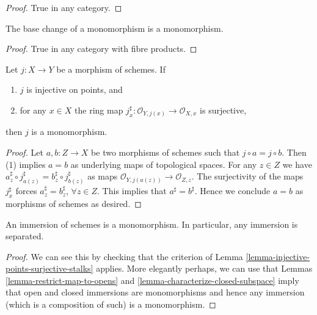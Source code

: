 \begin{proof}
True in any category.
\end{proof}

\begin{lemma}
\label{lemma-base-change-monomorphism}
The base change of a monomorphism is a monomorphism.
\end{lemma}

\begin{proof}
True in any category with fibre products.
\end{proof}

\begin{lemma}
\label{lemma-injective-points-surjective-stalks}
Let $j : X \to Y$ be a morphism of schemes.
If
\begin{enumerate}
\item $j$ is injective on points, and
\item for any $x \in X$ the ring map
$j^\sharp_x : \mathcal{O}_{Y, j(x)} \to \mathcal{O}_{X, x}$
is surjective,
\end{enumerate}
then $j$ is a monomorphism.
\end{lemma}

\begin{proof}
Let $a, b : Z \to X$ be two morphisms of schemes such that
$j \circ a  = j \circ b$.
Then (1) implies $a = b$ as underlying
maps of topological spaces.
For any $z \in Z$ we have
$a^\sharp_z \circ j^\sharp_{a(z)} = b^\sharp_z \circ j^\sharp_{b(z)}$
as maps $\mathcal{O}_{Y, j(a(z))} \to \mathcal{O}_{Z, z}$.
The surjectivity of the maps
$j^\sharp_x$ forces $a^\sharp_z = b^\sharp_z$, $\forall z \in Z$.
This implies that $a^\sharp = b^\sharp$.
Hence we conclude $a = b$ as morphisms of schemes
as desired.
\end{proof}

\begin{lemma}
\label{lemma-immersions-monomorphisms}
An immersion of schemes is a monomorphism.
In particular, any immersion is separated.
\end{lemma}

\begin{proof}
We can see this by checking that the criterion of
Lemma \ref{lemma-injective-points-surjective-stalks} applies.
More elegantly perhaps, we can use that
Lemmas \ref{lemma-restrict-map-to-opens} and
\ref{lemma-characterize-closed-subspace} imply that
open and closed immersions are monomorphisms and hence
any immersion (which is a composition of such)
is a monomorphism.
\end{proof}

